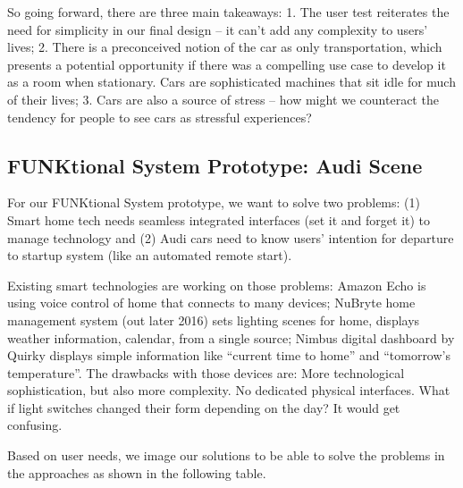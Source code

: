 So going forward, there are three main takeaways: 1. The user test reiterates the need for simplicity in our final design – it can’t add any complexity to users’ lives; 2. There is a preconceived notion of the car as only transportation, which presents a potential opportunity if there was a compelling use case to develop it as a room when stationary. Cars are sophisticated machines that sit idle for much of their lives; 3. Cars are also a source of stress – how might we counteract the tendency for people to see cars as stressful experiences?


\subsection{FUNKtional System Prototype: Audi Scene}

For our FUNKtional System prototype, we want to solve two problems: (1) Smart home tech needs seamless integrated interfaces (set it and forget it) to manage technology and (2) Audi cars need to know users’ intention for departure to startup system (like an automated remote start). 

 Existing smart technologies are working on those problems: Amazon Echo is using voice control of home that connects to many devices; NuBryte home management system (out later 2016) sets lighting scenes for home, displays weather information, calendar, from a single source; Nimbus digital dashboard by Quirky displays simple information like “current time to home” and “tomorrow’s temperature”. The drawbacks with those devices are: More technological sophistication, but also more complexity. No dedicated physical interfaces. What if light switches changed their form depending on the day? It would get confusing.

Based on user needs, we image our solutions to be able to solve the problems in the approaches as shown in the following table.

